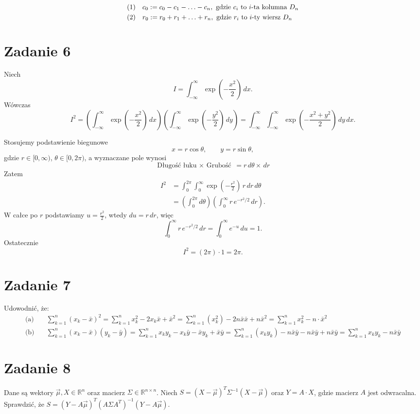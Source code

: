 \documentclass[11pt]{article}
\begin{document}
\begin{align*}
\text(1)&\quad c_{0}:=c_{0}-c_{1}-\ldots-c_{n}, \text{ gdzie $c_i$ to $i$-ta kolumna $D_n$}\\
\text(2)&\quad r_{0}:=r_{0}+r_{1}+\ldots+r_{n}, \text{ gdzie $r_i$ to $i$-ty wiersz $D_n$}
\end{align*}


\section*{Zadanie 6}
Niech
\[
I=\int_{-\infty}^{\infty} \exp\!\left(-\frac{x^{2}}{2}\right)\,dx.
\]
Wówczas
\[
I^{2}
=\left(\int_{-\infty}^{\infty} \exp\!\left(-\frac{x^{2}}{2}\right)\,dx\right)
 \left(\int_{-\infty}^{\infty} \exp\!\left(-\frac{y^{2}}{2}\right)\,dy\right)
=\int_{-\infty}^{\infty}\int_{-\infty}^{\infty}
\exp\!\left(-\frac{x^{2}+y^{2}}{2}\right)\,dy\,dx.
\]

Stosujemy podstawienie biegunowe
\[
x=r\cos\theta,\qquad y=r\sin\theta,
\]
gdzie \(r\in[0,\infty)\), \(\theta\in[0,2\pi)\), a wyznaczane pole wynosi
\[\text{Długość łuku $\times$ Grubość } = r\,d\theta\times\,dr\]
Zatem
\begin{align*}
I^{2}
&=\int_{0}^{2\pi}\int_{0}^{\infty}
\exp\!\left(-\frac{r^{2}}{2}\right)\, r \,dr\,d\theta \\
&=\left(\int_{0}^{2\pi} d\theta\right)
  \left(\int_{0}^{\infty} r\,e^{-r^{2}/2}\,dr\right).
\end{align*}
W całce po \(r\) podstawiamy \(u=\frac{r^{2}}{2}\), wtedy \(du=r\,dr\), więc
\[
\int_{0}^{\infty} r\,e^{-r^{2}/2}\,dr
=\int_{0}^{\infty} e^{-u}\,du
=1.
\]
Ostatecznie
\[
I^{2} = (2\pi)\cdot 1 = 2\pi.
\]

\section*{Zadanie 7}
Udowodnić, że:
\begin{align*}
\text{(a)}\quad& 
   \sum_{k=1}^{n}(x_k-\bar{x})^2
  =\sum_{k=1}^{n}x_k^2-2 x_k\bar{x}+\bar{x}^2
  =\sum_{k=1}^{n}(x_k^2)-2 n\bar{x}\bar{x}+n\bar{x}^2
  =\sum_{k=1}^{n}x_k^2-n\cdot\bar{x}^2  \\
\text{(b)}\quad& 
   \sum_{k=1}^{n}(x_k-\bar{x})(y_k-\bar{y})
  =\sum_{k=1}^{n}x_k y_k - x_k \bar{y} - \bar{x} y_k + \bar{x} \bar{y}
  =\sum_{k=1}^{n}(x_k y_k) - n \bar{x} \bar{y} - n \bar{x} \bar{y} + n \bar{x} \bar{y}
  =\sum_{k=1}^{n}x_k y_k - n\bar{x}\bar{y}
\end{align*}

\section*{Zadanie 8}
Dane są wektory $\vec{\mu}, X \in \mathbb{R}^n$ oraz macierz $\Sigma \in \mathbb{R}^{n\times n}$.
Niech $S = (X-\vec{\mu})^T\Sigma^{-1}(X-\vec{\mu})$ oraz $Y = A \cdot X$, gdzie macierz $A$ jest
odwracalna. Sprawdzić, że $S = (Y - A\vec{\mu})^T(A\Sigma A^T)^{-1}(Y - A\vec{\mu})$.
\end{document}
